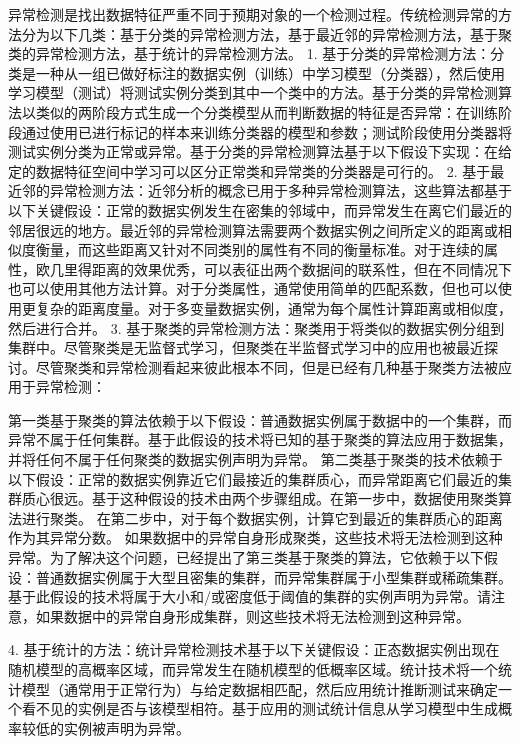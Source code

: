 \documentclass[a4paper,AutoFakeBold,oneside,12pt]{book}
\begin{document}
异常检测是找出数据特征严重不同于预期对象的一个检测过程。传统检测异常的方法分为以下几类：基于分类的异常检测方法，基于最近邻的异常检测方法，基于聚类的异常检测方法，基于统计的异常检测方法。
	1. 基于分类的异常检测方法：分类是一种从一组已做好标注的数据实例（训练）中学习模型（分类器），然后使用学习模型（测试）将测试实例分类到其中一个类中的方法。基于分类的异常检测算法以类似的两阶段方式生成一个分类模型从而判断数据的特征是否异常：在训练阶段通过使用已进行标记的样本来训练分类器的模型和参数；测试阶段使用分类器将测试实例分类为正常或异常。基于分类的异常检测算法基于以下假设下实现：在给定的数据特征空间中学习可以区分正常类和异常类的分类器是可行的。
	2. 基于最近邻的异常检测方法：近邻分析的概念已用于多种异常检测算法，这些算法都基于以下关键假设：正常的数据实例发生在密集的邻域中，而异常发生在离它们最近的邻居很远的地方。最近邻的异常检测算法需要两个数据实例之间所定义的距离或相似度衡量，而这些距离又针对不同类别的属性有不同的衡量标准。对于连续的属性，欧几里得距离的效果优秀，可以表征出两个数据间的联系性，但在不同情况下也可以使用其他方法计算。对于分类属性，通常使用简单的匹配系数，但也可以使用更复杂的距离度量。对于多变量数据实例，通常为每个属性计算距离或相似度，然后进行合并。
	3. 基于聚类的异常检测方法：聚类用于将类似的数据实例分组到集群中。尽管聚类是无监督式学习，但聚类在半监督式学习中的应用也被最近探讨。尽管聚类和异常检测看起来彼此根本不同，但是已经有几种基于聚类方法被应用于异常检测：

第一类基于聚类的算法依赖于以下假设：普通数据实例属于数据中的一个集群，而异常不属于任何集群。基于此假设的技术将已知的基于聚类的算法应用于数据集，并将任何不属于任何聚类的数据实例声明为异常。
第二类基于聚类的技术依赖于以下假设：正常的数据实例靠近它们最接近的集群质心，而异常距离它们最近的集群质心很远。基于这种假设的技术由两个步骤组成。在第一步中，数据使用聚类算法进行聚类。 在第二步中，对于每个数据实例，计算它到最近的集群质心的距离作为其异常分数。
如果数据中的异常自身形成聚类，这些技术将无法检测到这种异常。为了解决这个问题，已经提出了第三类基于聚类的算法，它依赖于以下假设：普通数据实例属于大型且密集的集群，而异常集群属于小型集群或稀疏集群。基于此假设的技术将属于大小和/或密度低于阈值的集群的实例声明为异常。请注意，如果数据中的异常自身形成集群，则这些技术将无法检测到这种异常。

4. 基于统计的方法：统计异常检测技术基于以下关键假设：正态数据实例出现在随机模型的高概率区域，而异常发生在随机模型的低概率区域。统计技术将一个统计模型（通常用于正常行为）与给定数据相匹配，然后应用统计推断测试来确定一个看不见的实例是否与该模型相符。基于应用的测试统计信息从学习模型中生成概率较低的实例被声明为异常。
\end{document}

